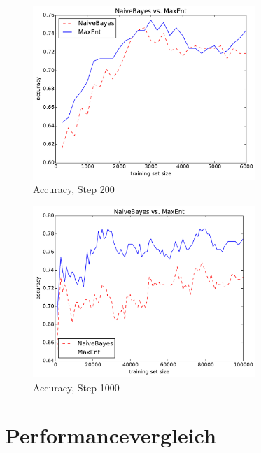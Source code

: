 \documentclass[12pt, oneside]{report}   	%
\begin{document}
\begin{figure}[htbp]
\begin{center}
\includegraphics[width=0.75\textwidth]{bilder/cmp_nb_vs_me_S200_M6000.pdf}
\caption{Accuracy, Step 200}
\label{img:acc2}
\end{center}
\end{figure}

\begin{figure}[htbp]
\begin{center}
\includegraphics[width=0.75\textwidth]{bilder/cmp_nb_vs_me_S1000_M100000.pdf}
\caption{Accuracy, Step 1000}
\label{img:acc3}
\end{center}
\end{figure}


\section{Performancevergleich}
\end{document}
